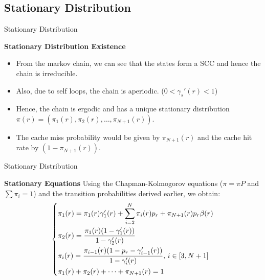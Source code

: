 \documentclass[
	xcolor={svgnames},
	hyperref={pagebackref,bookmarks},
	aspectratio=43,
]{beamer}
\begin{document}
\subsection*{Stationary Distribution}
\begin{frame}{Stationary Distribution}
    \begin{block}{\textbf{Stationary Distribution Existence}}
        \begin{itemize}
            \item From the markov chain, we can see that the states form a SCC and hence the chain is irreducible. 
            \item Also, due to self loops, the chain is aperiodic. ($0 < \gamma_s'(r) < 1$) 
            \item Hence, the chain is ergodic and has a unique stationary distribution $\pi(r) = (\pi_1(r), \pi_2(r), \ldots, \pi_{N+1}(r))$.
            \item The cache miss probability would be given by $\pi_{N+1}(r)$ and the cache hit rate by $(1 - \pi_{N+1}(r))$.
        \end{itemize}
    \end{block}
\end{frame}

\begin{frame}{Stationary Distribution}
    \begin{block}{\textbf{Stationary Equations}}
        Using the Chapman-Kolmogorov equations ($\pi = \pi P$ and $\sum\pi_i = 1$) and the transition probabilities derived earlier, we obtain:
        \begin{equation}
            \begin{dcases*}
                \pi_1(r) = \pi_1(r)\gamma_1'(r) + \sum_{i=2}^{N} \pi_i(r)p_r + \pi_{N+1}(r)p_r\beta(r) \\
                \pi_2(r) = \frac{\pi_1(r)(1 - \gamma_1'(r))}{1 - \gamma_2'(r)} \\
                \pi_i(r) = \frac{\pi_{i-1}(r)(1 - p_r - \gamma_{i-1}'(r))}{1 - \gamma_i'(r)}, \, i \in \lbrack 3, N+1 \rbrack \\
                \pi_1(r) + \pi_2(r) + \cdots + \pi_{N+1}(r) = 1
            \end{dcases*}
        \end{equation}
    \end{block}
\end{frame}
\end{document}
